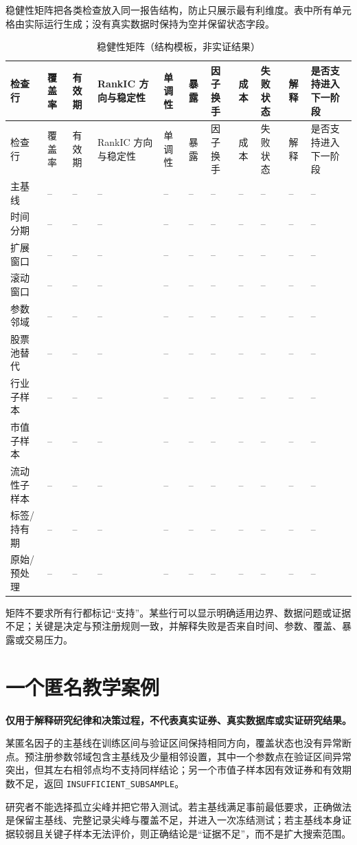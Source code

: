 稳健性矩阵把各类检查放入同一报告结构，防止只展示最有利维度。表中所有单元格由实际运行生成；没有真实数据时保持为空并保留状态字段。

\begingroup
\scriptsize
\setlength{\tabcolsep}{1.5pt}
\begin{longtable}{@{}p{1.75cm}p{0.9cm}p{0.8cm}p{1.25cm}p{1.05cm}p{1.0cm}p{0.95cm}p{0.95cm}p{1.0cm}p{2.0cm}p{1.1cm}@{}}
\caption{稳健性矩阵（结构模板，非实证结果）}\label{tab:ch07-robustness-matrix}\\
\toprule
检查行 & 覆盖率 & 有效期 & RankIC 方向与稳定性 & 单调性 & 暴露 & 因子换手 & 成本 & 失败状态 & 解释 & 是否支持进入下一阶段 \\
\midrule
\endfirsthead
\toprule
检查行 & 覆盖率 & 有效期 & RankIC 方向与稳定性 & 单调性 & 暴露 & 因子换手 & 成本 & 失败状态 & 解释 & 是否支持进入下一阶段 \\
\midrule
\endhead
主基线 & -- & -- & -- & -- & -- & -- & -- & -- & -- & -- \\
时间分期 & -- & -- & -- & -- & -- & -- & -- & -- & -- & -- \\
扩展窗口 & -- & -- & -- & -- & -- & -- & -- & -- & -- & -- \\
滚动窗口 & -- & -- & -- & -- & -- & -- & -- & -- & -- & -- \\
参数邻域 & -- & -- & -- & -- & -- & -- & -- & -- & -- & -- \\
股票池替代 & -- & -- & -- & -- & -- & -- & -- & -- & -- & -- \\
行业子样本 & -- & -- & -- & -- & -- & -- & -- & -- & -- & -- \\
市值子样本 & -- & -- & -- & -- & -- & -- & -- & -- & -- & -- \\
流动性子样本 & -- & -- & -- & -- & -- & -- & -- & -- & -- & -- \\
标签/持有期 & -- & -- & -- & -- & -- & -- & -- & -- & -- & -- \\
原始/预处理 & -- & -- & -- & -- & -- & -- & -- & -- & -- & -- \\
\bottomrule
\end{longtable}
\endgroup

矩阵不要求所有行都标记“支持”。某些行可以显示明确适用边界、数据问题或证据不足；关键是决定与预注册规则一致，并解释失败是否来自时间、参数、覆盖、暴露或交易压力。

\section{一个匿名教学案例}

\begin{casebox}
\textbf{仅用于解释研究纪律和决策过程，不代表真实证券、真实数据库或实证研究结果。}

某匿名因子的主基线在训练区间与验证区间保持相同方向，覆盖状态也没有异常断点。预注册参数邻域包含主基线及少量相邻设置，其中一个参数点在验证区间异常突出，但其左右相邻点均不支持同样结论；另一个市值子样本因有效证券和有效期数不足，返回 \texttt{INSUFFICIENT\_SUBSAMPLE}。

研究者不能选择孤立尖峰并把它带入测试。若主基线满足事前最低要求，正确做法是保留主基线、完整记录尖峰与覆盖不足，并进入一次冻结测试；若主基线本身证据较弱且关键子样本无法评价，则正确结论是“证据不足”，而不是扩大搜索范围。
\end{casebox}

